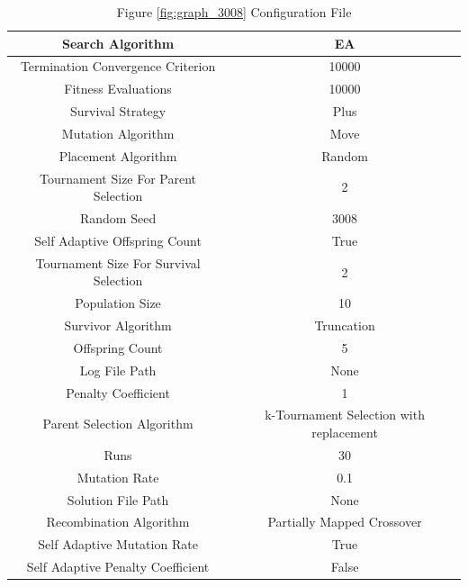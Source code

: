\documentclass{standalone}
\begin{document}
\begin{table}[!htb]
	\centering
	\caption{Figure \ref{fig:graph_3008} Configuration File}
	\label{tab:graph_3008}
	\begin{tabular}{| c | c |}
		\hline
		Search Algorithm		& EA		 \\
		\hline
		Termination Convergence Criterion		& 10000		 \\
		\hline
		Fitness Evaluations		& 10000		 \\
		\hline
		Survival Strategy		& Plus		 \\
		\hline
		Mutation Algorithm		& Move		 \\
		\hline
		Placement Algorithm		& Random		 \\
		\hline
		Tournament Size For Parent Selection		& 2		 \\
		\hline
		Random Seed		& 3008		 \\
		\hline
		Self Adaptive Offspring Count		& True		 \\
		\hline
		Tournament Size For Survival Selection		& 2		 \\
		\hline
		Population Size		& 10		 \\
		\hline
		Survivor Algorithm		& Truncation		 \\
		\hline
		Offspring Count		& 5		 \\
		\hline
		Log File Path		& None		 \\
		\hline
		Penalty Coefficient		& 1		 \\
		\hline
		Parent Selection Algorithm		& k-Tournament Selection with replacement		 \\
		\hline
		Runs		& 30		 \\
		\hline
		Mutation Rate		& 0.1		 \\
		\hline
		Solution File Path		& None		 \\
		\hline
		Recombination Algorithm		& Partially Mapped Crossover		 \\
		\hline
		Self Adaptive Mutation Rate		& True		 \\
		\hline
		Self Adaptive Penalty Coefficient		& False		 \\
		\hline
	\end{tabular}
\end{table}
\end{document}
